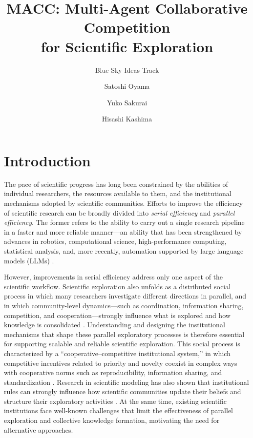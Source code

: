 \documentclass[sigconf]{aamas}
\title{\texorpdfstring{MACC: Multi-Agent Collaborative Competition \\ for Scientific Exploration}{MACC: Multi-Agent Collaborative Competition for Scientific Exploration}}
\subtitle{Blue Sky Ideas Track}
\author{Satoshi Oyama}
\affiliation{
  \institution{Nagoya City University}
  \city{Nagoya}
  \country{Japan}}
\author{Yuko Sakurai}
\affiliation{
  \institution{Nagoya Institute of Technology}
  \city{Nagoya}
  \country{Japan}}
\author{Hisashi Kashima}
\affiliation{
  \institution{Kyoto University}
  \city{Kyoto}
  \country{Japan}}
\begin{document}

\pagestyle{fancy}
\fancyhead{}


\maketitle 

\section{Introduction}

The pace of scientific progress has long been constrained by the abilities of individual researchers, the resources available to them, and the institutional mechanisms adopted by scientific communities. Efforts to improve the efficiency of scientific research can be broadly divided into \textit{serial efficiency} and \textit{parallel efficiency}. The former refers to the ability to carry out a single research pipeline in a faster and more reliable manner—an ability that has been strengthened by advances in robotics, computational science, high-performance computing, statistical analysis, and, more recently, automation supported by large language models (LLMs) \cite{King2009Automation, Luo2025LLM4SR, Zhang2024ScientificLLMs, Zheng2025LLMScienceSurvey}. 

However, improvements in serial efficiency address only one aspect of the scientific workflow. Scientific exploration also unfolds as a distributed social process in which many researchers investigate different directions in parallel, and in which community-level dynamics—such as coordination, information sharing, competition, and cooperation—strongly influence what is explored and how knowledge is consolidated \cite{oconnor2023modelling, zhang2025collective}. Understanding and designing the institutional mechanisms that shape these parallel exploratory processes is therefore essential for supporting scalable and reliable scientific exploration.
This social process is characterized by a ``cooperative--competitive institutional system,'' in which competitive incentives related to priority and novelty coexist in complex ways with cooperative norms such as reproducibility, information sharing, and standardization \cite{NickelsenKraemer2017, KosmuetzkyKruecken2022, CuiYasseri2024CollectiveIntelligence}. Research in scientific modeling has also shown that institutional rules can strongly influence how scientific communities update their beliefs and structure their exploratory activities \cite{oconnor2023modelling}. At the same time, existing scientific institutions face well-known challenges that limit the effectiveness of parallel exploration and collective knowledge formation, motivating the need for alternative approaches.
\end{document}
